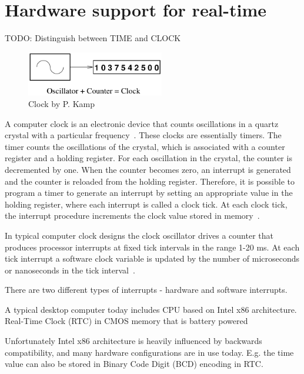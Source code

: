 
\chapter{Hardware support for real-time}
TODO: Distinguish between TIME and CLOCK

\begin{figure}
	\centering
	\includegraphics[width=6cm,keepaspectratio]{fig/clock.png}
	\caption{Clock by P. Kamp}
	\label{fig:hw-clock}
\end{figure}

A computer clock is an electronic device that counts oscillations in a
quartz crystal with a particular frequency~\cite{thesis-sync}.
These clocks are essentially timers.
The timer counts the oscillations of the crystal, which is associated with
a counter register and a holding register.
For each oscillation in the crystal, the counter is decremented by one.
When the counter becomes zero, an interrupt is generated and the
counter is reloaded from the holding register.
Therefore, it is possible to
program a timer to generate an interrupt by setting an appropriate value in
the holding register, where each interrupt is called a clock tick.
At each clock tick,
the interrupt procedure increments the clock value stored in memory~\cite{thesis-sync}.

In typical computer clock designs the clock oscillator drives a counter that produces processor interrupts at
fixed tick intervals in the range 1-20 ms.
At each tick interrupt a software clock variable is updated by the
number of microseconds or nanoseconds in the tick interval~\cite{timecounters}.


There are two different types of interrupts - hardware and software interrupts.

A typical desktop computer today includes CPU based on Intel x86 architecture.
Real-Time Clock (RTC) in CMOS memory that is battery powered

Unfortunately Intel x86 architecture is heavily influenced by backwards compatibility,
and many hardware configurations are in use today.
E.g. the time value can also be stored in Binary Code Digit (BCD) encoding in RTC.

